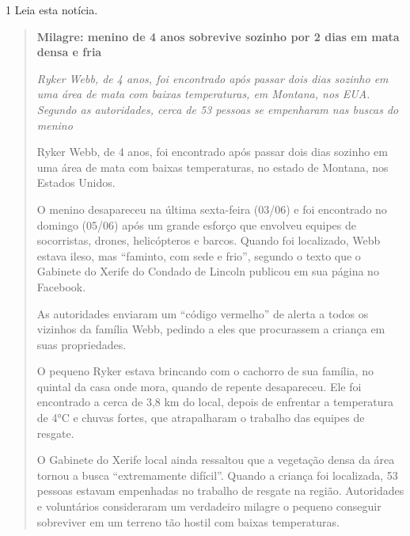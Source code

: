 
\num{1} Leia esta notícia.



\begin{quote}
\textbf{Milagre: menino de 4 anos sobrevive sozinho por 2 dias em mata densa e fria}

\emph{Ryker Webb, de 4 anos, foi encontrado após passar dois dias
sozinho em uma área de mata com baixas temperaturas, em Montana, nos
EUA. Segundo as autoridades, cerca de 53 pessoas se empenharam nas
buscas do menino}

Ryker Webb, de 4 anos, foi encontrado após passar dois dias sozinho em
uma área de mata com baixas temperaturas, no estado de Montana, nos
Estados Unidos.

O menino desapareceu na última sexta-feira (03/06) e foi encontrado no
domingo (05/06) após um grande esforço que envolveu equipes de
socorristas, drones, helicópteros e barcos. Quando foi localizado, Webb
estava ileso, mas ``faminto, com sede e frio'', segundo o texto que o
Gabinete do Xerife do Condado de Lincoln publicou em sua página no
Facebook.

As autoridades enviaram um ``código vermelho'' de alerta a todos os
vizinhos da família Webb, pedindo a eles que procurassem a criança em
suas propriedades.

O pequeno Ryker estava brincando com o cachorro de sua família, no
quintal da casa onde mora, quando de repente desapareceu. Ele foi
encontrado a cerca de 3,8 km do local, depois de enfrentar a temperatura
de 4°C e chuvas fortes, que atrapalharam o trabalho das equipes de
resgate.

O Gabinete do Xerife local ainda ressaltou que a vegetação densa da área
tornou a busca ``extremamente difícil''. Quando a criança foi
localizada, 53 pessoas estavam empenhadas no trabalho
de resgate na
região. Autoridades e voluntários consideraram um verdadeiro milagre o
pequeno conseguir sobreviver em um terreno tão hostil com baixas
temperaturas.

\end{quote}

